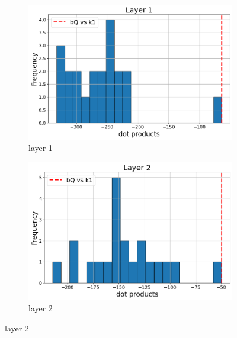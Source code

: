 \documentclass[11pt]{article}
\begin{document}



\appendix

\section{}\label{app:bias_term}

\begin{figure}[t]
  \begin{subfigure}[t]{0.24\textwidth}
    \centering
    \includegraphics[width=1.4\columnwidth]{figures/obs1_appendix/obs1_layer1.png}
    \caption{layer 1}
  \end{subfigure}\hfill
  \begin{subfigure}[t]{0.24\textwidth}
    \centering
    \includegraphics[width=1.4\columnwidth]{figures/obs1_appendix/obs1_layer2.png}
    \caption{layer 2}
  \end{subfigure}\hfill

\end{figure}
\end{document}
